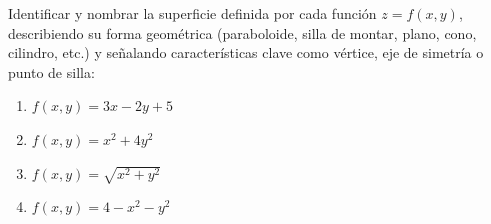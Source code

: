 Identificar y nombrar la superficie definida por cada función $z = f(x,y)$, describiendo su forma geométrica (paraboloide, silla de montar, plano, cono, cilindro, etc.) y señalando características clave como vértice, eje de simetría o punto de silla:
\begin{enumerate}
    \item $f(x,y) = 3x - 2y + 5$
    \item $f(x,y) = x^2 + 4y^2$
    \item $f(x,y) = \sqrt{x^2 + y^2}$
    \item $f(x,y) = 4 - x^2 - y^2$
\end{enumerate}